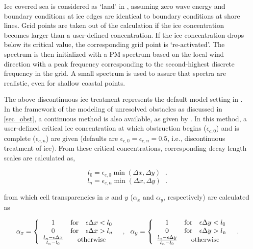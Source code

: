 \noindent
Ice covered sea is considered as `land' in \ws, assuming zero wave energy and
boundary conditions at ice edges are identical to boundary conditions at shore
lines. Grid points are taken out of the calculation if the ice concentration
becomes larger than a user-defined concentration. If the ice concentration
drops below its critical value, the corresponding grid point is
`re-activated'. The spectrum is then initialized with a PM spectrum based on
the local wind direction with a peak frequency corresponding to the
second-highest discrete frequency in the grid. A small spectrum is used to
assure that spectra are realistic, even for shallow coastal points.

The above discontinuous ice treatment represents the default model setting in
\ws. In the framework of the modeling of unresolved obstacles as discussed in
\para\ref{sec_obst}, a continuous method is also available, as given by
\cite{tol:OMOD03a}. In this method, a user-defined critical ice concentration
at which obstruction begins ($\epsilon_{c,0}$) and is complete
($\epsilon_{c,n}$) are given (defaults are $\epsilon_{c,0} = \epsilon_{c,n} =
0.5$, i.e., discontinuous treatment of ice). From these critical
concentrations, corresponding decay length scales are calculated as,

\begin{equation}
l_0 = \epsilon_{c,0} \min ( \Delta x , \Delta y )
\:\:\: . \label{eq:l0}
\end{equation}
\begin{equation}
l_n = \epsilon_{c,n} \min ( \Delta x , \Delta y )
\:\:\: . \label{eq:ln}
\end{equation}

\noindent
from which cell transparencies in $x$ and $y$ ($\alpha_x$ and $\alpha_y$,
respectively) are calculated as

\begin{equation}
\alpha_x = \left \{ \begin{array}{ccl}
 1 & \mbox{for} & \epsilon \Delta x < l_0 \\
 0 & \mbox{for} & \epsilon \Delta x > l_n \\
\frac{l_n - \epsilon \Delta x}{l_n - l_0} & \multicolumn{2}{c}{\mbox{otherwise}} 
\end{array} \right .
\:\:\: , \:\:\:
\alpha_y = \left \{ \begin{array}{ccl}
 1 & \mbox{for} & \epsilon \Delta y < l_0 \\
 0 & \mbox{for} & \epsilon \Delta y > l_n \\
\frac{l_n - \epsilon \Delta y}{l_n - l_0} & \multicolumn{2}{c}{\mbox{otherwise}} 
\end{array} \right .
\:\:\: . \label{eq:ice_0} 
\end{equation}


